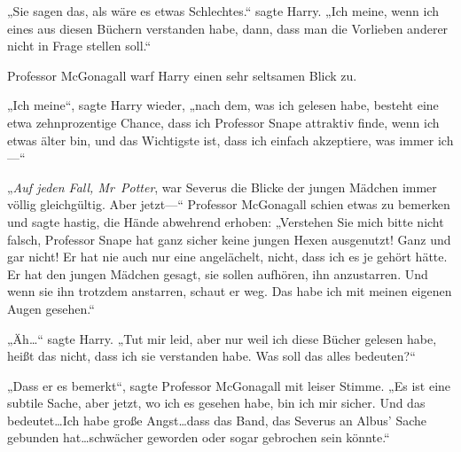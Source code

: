 „Sie sagen das, als wäre es etwas Schlechtes.“ sagte Harry. „Ich meine, wenn ich eines aus diesen Büchern verstanden habe, dann, dass man die Vorlieben anderer nicht in Frage stellen soll.“

Professor McGonagall warf Harry einen sehr seltsamen Blick zu.

„Ich meine“, sagte Harry wieder, „nach dem, was ich gelesen habe, besteht eine etwa zehnprozentige Chance, dass ich Professor Snape attraktiv finde, wenn ich etwas älter bin, und das Wichtigste ist, dass ich einfach akzeptiere, was immer ich—“

„\emph{Auf jeden Fall, Mr~Potter}, war Severus die Blicke der jungen Mädchen immer völlig gleichgültig. Aber jetzt—“ Professor McGonagall schien etwas zu bemerken und sagte hastig, die Hände abwehrend erhoben: „Verstehen Sie mich bitte nicht falsch, Professor Snape hat ganz sicher keine jungen Hexen ausgenutzt! Ganz und gar nicht! Er hat nie auch nur eine angelächelt, nicht, dass ich es je gehört hätte. Er hat den jungen Mädchen gesagt, sie sollen aufhören, ihn anzustarren. Und wenn sie ihn trotzdem anstarren, schaut er weg. Das habe ich mit meinen eigenen Augen gesehen.“

„Äh…“ sagte Harry. „Tut mir leid, aber nur weil ich diese Bücher gelesen habe, heißt das nicht, dass ich sie verstanden habe. Was soll das alles bedeuten?“

„Dass er es bemerkt“, sagte Professor McGonagall mit leiser Stimme. „Es ist eine subtile Sache, aber jetzt, wo ich es gesehen habe, bin ich mir sicher. Und das bedeutet…Ich habe große Angst…dass das Band, das Severus an Albus' Sache gebunden hat…schwächer geworden oder sogar gebrochen sein könnte.“

